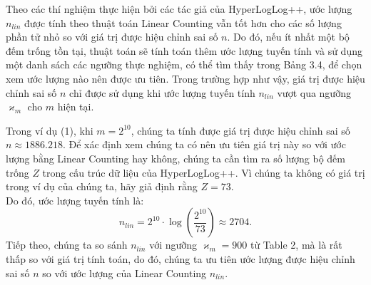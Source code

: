 \documentclass[letterpaper,13pt]{article}
\theoremstyle{mytheor}
\begin{document}
Theo các thí nghiệm thực hiện bởi các tác giả của HyperLogLog++, ước lượng $n_{lin}$ được tính theo thuật toán 
Linear Counting vẫn tốt hơn cho các số lượng phần tử nhỏ so với giá trị được hiệu chỉnh sai số $n$. Do đó, nếu ít nhất một bộ đếm trống tồn tại, 
thuật toán sẽ tính toán thêm ước lượng tuyến tính và sử dụng một danh sách các ngưỡng thực nghiệm, có thể tìm thấy trong Bảng 3.4, để chọn xem ước lượng 
nào nên được ưu tiên. Trong trường hợp như vậy, giá trị được hiệu chỉnh sai số $n$ chỉ được sử dụng khi ước lượng tuyến tính $n_{lin}$ 
vượt qua ngưỡng $\varkappa_m$ cho $m$ hiện tại.
\begin{mdframed}
    \vspace{0.25cm}
    Trong ví dụ (1), khi $m = 2^{10}$, chúng ta tính được giá trị được hiệu chỉnh sai số $n \approx 1886.218$. Để xác định xem chúng ta có nên 
    ưu tiên giá trị này so với ước lượng bằng Linear Counting hay không, chúng ta cần tìm ra số lượng bộ đếm trống $Z$ trong cấu trúc dữ liệu của 
    HyperLogLog++. Vì chúng ta không có giá trị trong ví dụ của chúng ta, hãy giả định rằng $Z = 73$.\\
    Do đó, ước lượng tuyến tính là:
    \[n_{lin} = 2^{10} \cdot \log\left(\frac{2^{10}}{73}\right) \approx 2704.\]
    Tiếp theo, chúng ta so sánh $n_{lin}$ với ngưỡng $\varkappa_m = 900$ từ Table 2, mà là rất thấp so với giá trị tính toán, do đó, 
    chúng ta ưu tiên ước lượng được hiệu chỉnh sai số $n$ so với ước lượng của Linear Counting $n_{lin}$.
    
\end{mdframed}
    
\end{document}
